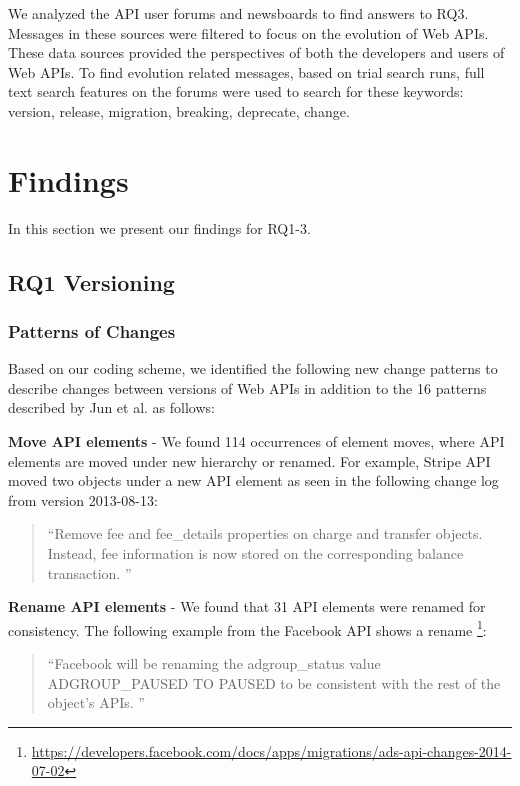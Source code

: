 \documentclass[conference]{IEEEtran}
\begin{document}
We analyzed the API user forums and newsboards to find answers to RQ3. Messages in these sources were filtered to focus on the evolution of Web APIs. These data sources provided the perspectives of both the developers and users of Web APIs. To find evolution related messages, based on trial search runs, full text search features on the forums were used to search for these keywords: version, release, migration, breaking, deprecate, change.


\section{Findings} %
\label{sec:findings}

In this section we present our findings for RQ1-3.

\subsection{RQ1 Versioning} %
\label{sub:versioning}


\subsubsection{Patterns of Changes}

Based on our coding scheme, we identified the following new change patterns to describe changes between versions of Web APIs in addition to the 16 patterns described by Jun et al. \cite{li_client_2013} as follows:

\textbf{Move API elements} - We found 114 occurrences of element moves, where API elements are moved under new hierarchy or renamed. For example, Stripe API moved two objects under a new API element as seen in the following change log from version 2013-08-13:

\small
\begin{quotation}
``Remove fee and fee\_details properties on charge and transfer objects. Instead, fee information is now stored on the corresponding balance transaction.
''\end{quotation}
\normalsize

\textbf{Rename API elements} - We found that 31 API elements were renamed for consistency. The following example from the Facebook API shows a rename \footnote{\url{https://developers.facebook.com/docs/apps/migrations/ads-api-changes-2014-07-02}}:

\small
\begin{quotation}
``Facebook will be renaming the adgroup\_status value ADGROUP\_PAUSED TO PAUSED to be consistent with the rest of the object's APIs.
''\end{quotation}
\normalsize
\end{document}
